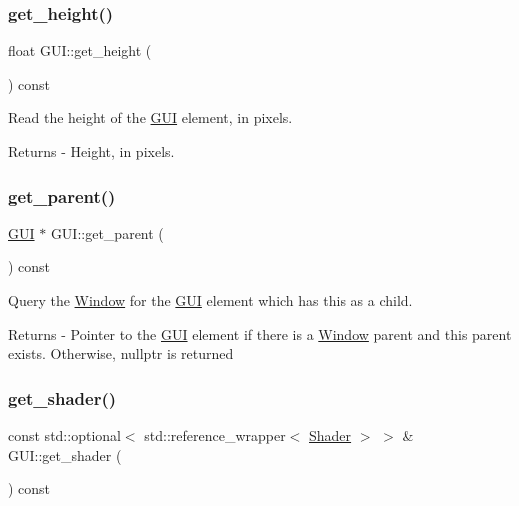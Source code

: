 \subsubsection{\texorpdfstring{get\+\_\+height()}{get\_height()}}
{\footnotesize\ttfamily float G\+U\+I\+::get\+\_\+height (\begin{DoxyParamCaption}{ }\end{DoxyParamCaption}) const\hspace{0.3cm}{\ttfamily [virtual]}}

Read the height of the \mbox{\hyperlink{class_g_u_i}{G\+UI}} element, in pixels. \begin{DoxyReturn}{Returns}
-\/ Height, in pixels. 
\end{DoxyReturn}
\mbox{\label{class_g_u_i_af134d9b5a265ad8996d1bea642fd06b9}} 
\subsubsection{\texorpdfstring{get\+\_\+parent()}{get\_parent()}}
{\footnotesize\ttfamily \mbox{\hyperlink{class_g_u_i}{G\+UI}} $\ast$ G\+U\+I\+::get\+\_\+parent (\begin{DoxyParamCaption}{ }\end{DoxyParamCaption}) const}

Query the \mbox{\hyperlink{class_window}{Window}} for the \mbox{\hyperlink{class_g_u_i}{G\+UI}} element which has this as a child. \begin{DoxyReturn}{Returns}
-\/ Pointer to the \mbox{\hyperlink{class_g_u_i}{G\+UI}} element if there is a \mbox{\hyperlink{class_window}{Window}} parent and this parent exists. Otherwise, nullptr is returned 
\end{DoxyReturn}
\mbox{\label{class_g_u_i_a4c8efe5f6b75a644ada33b438560baa9}} 
\subsubsection{\texorpdfstring{get\+\_\+shader()}{get\_shader()}}
{\footnotesize\ttfamily const std\+::optional$<$ std\+::reference\+\_\+wrapper$<$ \mbox{\hyperlink{class_shader}{Shader}} $>$ $>$ \& G\+U\+I\+::get\+\_\+shader (\begin{DoxyParamCaption}{ }\end{DoxyParamCaption}) const}

